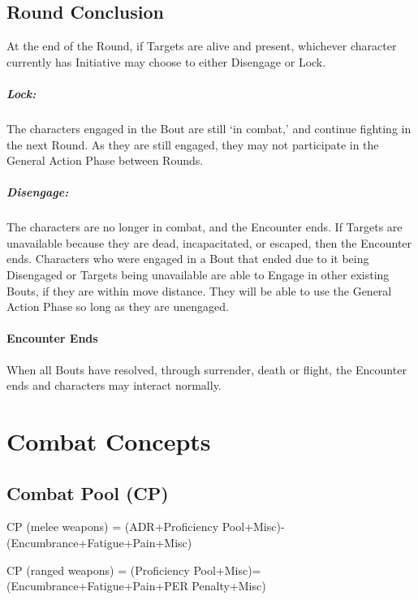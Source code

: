 \documentclass[oneside,11pt,english]{book}
\begin{document}
\subsection{Round Conclusion}
At the end of the Round, if Targets are alive and present, whichever character currently has Initiative may
choose to either Disengage or Lock.

\subparagraph{Lock:}
The characters engaged in the Bout are still `in combat,' and continue fighting in the next Round. As they are still engaged, they may not participate in the General Action Phase between Rounds.
\subparagraph{Disengage:}
The characters are no longer in combat, and the Encounter ends.
If Targets are unavailable because they are dead, incapacitated, or escaped, then the Encounter ends.
Characters who were engaged in a Bout that ended due to it being Disengaged or Targets being
unavailable are able to Engage in other existing Bouts, if they are within move distance. They will be able
to use the General Action Phase so long as they are unengaged.

\paragraph{Encounter Ends}
When all Bouts have resolved, through surrender, death or flight, the Encounter ends and characters may
interact normally.


\section{Combat Concepts}
\subsection{Combat Pool (CP)}
CP (melee weapons) = (ADR+Proficiency Pool+Misc)-(Encumbrance+Fatigue+Pain+Misc)

CP (ranged weapons) = (Proficiency Pool+Misc)=(Encumbrance+Fatigue+Pain+PER Penalty+Misc)
\end{document}
